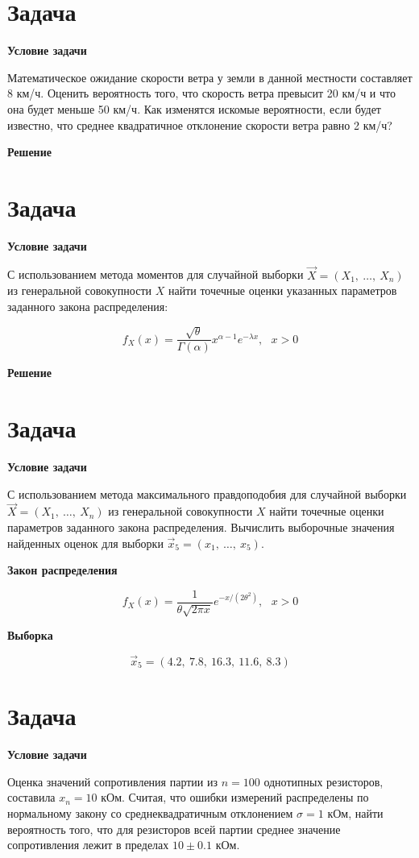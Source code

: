 \chapter{Задача}

\textbf{Условие задачи}

Математическое ожидание скорости ветра у земли в данной местности составляет 8 км/ч. Оценить вероятность того, что скорость ветра превысит 20 км/ч и что она
будет меньше 50 км/ч. Как изменятся искомые вероятности, если будет известно, что среднее квадратичное отклонение скорости ветра равно 2 км/ч?

\textbf{Решение}



\chapter{Задача}

\textbf{Условие задачи}

С использованием метода моментов для случайной выборки $\overrightarrow{X} = (X_1,~\dots,~X_n)$ из генеральной совокупности $X$ найти точечные оценки указанных параметров заданного закона распределения:

\begin{equation*}
	f_X(x) = \frac{\sqrt{\theta}}{\Gamma(\alpha)} x^{\alpha - 1}e^{-\lambda x},~~~x>0
\end{equation*}

\textbf{Решение}

\chapter{Задача}

\textbf{Условие задачи}

С использованием метода максимального правдоподобия для случайной выборки $\overrightarrow{X}
= (X_1, ~\dots,~X_n)$ из генеральной совокупности $X$ найти точечные оценки параметров заданного
закона распределения. Вычислить выборочные значения найденных оценок для выборки $\overrightarrow{x}_5 = (x_1,~\dots,~x_5)$.

\textbf{Закон распределения}

\begin{equation*}
	f_X(x)=\frac{1}{\theta\sqrt{2\pi x}}e^{-x/(2\theta^2)},~~~x>0
\end{equation*}

\textbf{Выборка}

\begin{equation*}
	\overrightarrow{x}_5 = (4.2,~7.8,~16.3,~11.6,~8.3)
\end{equation*}

\chapter{Задача}

\textbf{Условие задачи}

Оценка значений сопротивления партии из $n=100$ однотипных резисторов, составила $x_n=10$ кОм. Считая, что ошибки измерений распределены по нормальному закону
со среднеквадратичным отклонением $\sigma=1$ кОм, найти вероятность того, что для резисторов
всей партии среднее значение сопротивления лежит в пределах $10\pm0.1$ кОм.
